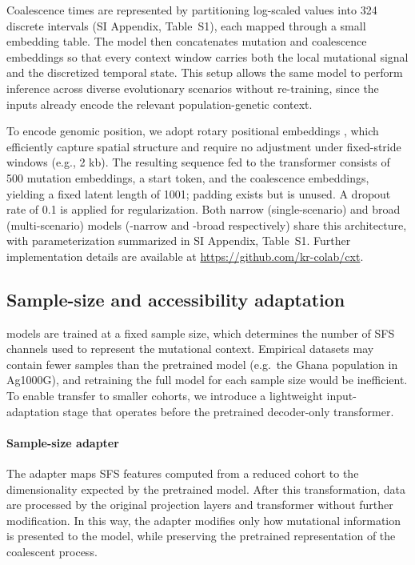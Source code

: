 \documentclass[9pt,twocolumn,twoside]{pnas-new} %
\begin{document}
{Coalescence times are represented by partitioning log-scaled values into 324 discrete intervals (SI Appendix, Table~S1), each mapped through a small embedding table. 
The model then concatenates mutation and coalescence embeddings
so that every context window carries both the local mutational signal and the discretized temporal state. 
This setup allows the same model to perform inference across diverse evolutionary scenarios without re-training, 
since the inputs already encode the relevant population-genetic context.

To encode genomic position, we adopt rotary positional embeddings \cite{su_roformer_2023},
which efficiently capture spatial structure and require no adjustment under fixed-stride windows (e.g., 2 kb).
The resulting sequence fed to the transformer consists of 500 mutation embeddings, a start token, 
and the coalescence embeddings, yielding a fixed latent length of 1001; padding exists but is unused. 
A dropout rate of 0.1 is applied for regularization. 
Both narrow (single-scenario) and broad (multi-scenario) models (\cxtkit-narrow and \cxtkit-broad respectively) share this architecture, 
with parameterization summarized in SI Appendix, Table~S1. 
Further implementation details are available at \url{https://github.com/kr-colab/cxt}.

\subsection*{Sample-size and accessibility adaptation}
\label{sec:adapter}

\cxtkit models are trained at a fixed sample size, which determines the number of
SFS channels used to represent the mutational context.
Empirical datasets may contain fewer samples than the pretrained model
(e.g.\ the Ghana population in Ag1000G), and retraining the full model for each
sample size would be inefficient.
To enable transfer to smaller cohorts, we introduce a lightweight input-adaptation stage that operates
before the pretrained decoder-only transformer.

\paragraph{Sample-size adapter}
The adapter maps SFS features computed from a reduced cohort to the dimensionality
expected by the pretrained model.
After this transformation, data are processed by the original projection layers
and transformer without further modification.
In this way, the adapter modifies only how mutational information is presented to
the model, while preserving the pretrained representation of the coalescent process.

}
\end{document}
